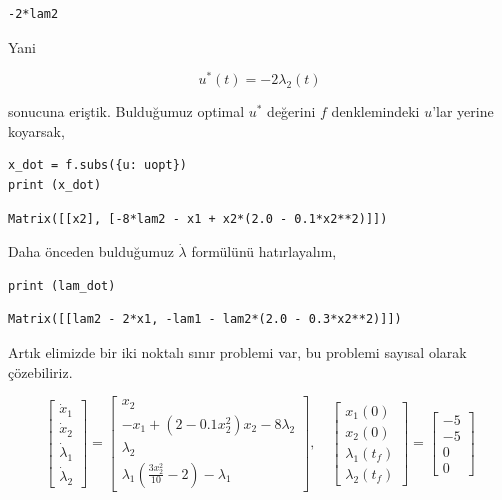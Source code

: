 \documentclass[12pt,fleqn]{article}\usepackage{../../common}
\begin{document}
\begin{verbatim}
-2*lam2
\end{verbatim}

Yani

$$
u^*(t) = -2 \lambda_2(t)
$$

sonucuna eriştik. Bulduğumuz optimal $u^*$ değerini $f$ denklemindeki
$u$'lar yerine koyarsak,

\begin{verbatim}
x_dot = f.subs({u: uopt})
print (x_dot)
\end{verbatim}

\begin{verbatim}
Matrix([[x2], [-8*lam2 - x1 + x2*(2.0 - 0.1*x2**2)]])
\end{verbatim}

Daha önceden bulduğumuz $\dot{\lambda}$ formülünü hatırlayalım,

\begin{verbatim}
print (lam_dot)
\end{verbatim}

\begin{verbatim}
Matrix([[lam2 - 2*x1, -lam1 - lam2*(2.0 - 0.3*x2**2)]])
\end{verbatim}

Artık elimizde bir iki noktalı sınır problemi var, bu problemi sayısal
olarak çözebiliriz. 

$$
\left[\begin{array}{c}
\dot{x}_1 \\ 
\dot{x}_2 \\ 
\dot{\lambda}_1 \\ 
\dot{\lambda}_2 
\end{array}\right] = 
\left[\begin{array}{c}
x_2 \\ 
-x_1 + (2 - 0.1 x_2^2 ) x_2 - 8 \lambda_2 \\
\lambda_2 \\
\lambda_1 \left( \frac{3x_2^2}{10} - 2  \right) - \lambda_1
\end{array}\right], 
\quad
\left[\begin{array}{c}
x_1(0) \\ x_2(0) \\ \lambda_1(t_f) \\ \lambda_2(t_f)
\end{array}\right] = 
\left[\begin{array}{c}
-5 \\ -5 \\ 0 \\ 0
\end{array}\right]
$$
\end{document}
